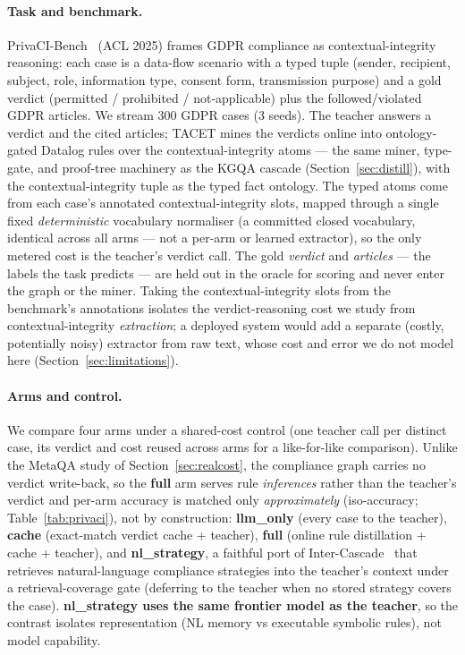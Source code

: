 \documentclass[11pt]{article}
\theoremstyle{plain}
\begin{document}
\paragraph{Task and benchmark.} PrivaCI-Bench~\citep{privacibench2025} (ACL
2025) frames GDPR compliance as contextual-integrity reasoning: each case is a
data-flow scenario with a typed tuple (sender, recipient, subject, role,
information type, consent form, transmission purpose) and a gold verdict
(permitted / prohibited / not-applicable) plus the followed/violated GDPR
articles. We stream $300$ GDPR cases ($3$ seeds). The teacher answers a
verdict and the cited articles; TACET mines the verdicts online into
ontology-gated Datalog rules over the contextual-integrity atoms --- the same
miner, type-gate, and proof-tree machinery as the KGQA cascade
(Section~\ref{sec:distill}), with the contextual-integrity tuple as the typed
fact ontology. The typed atoms come from each case's annotated
contextual-integrity slots, mapped through a single fixed \emph{deterministic}
vocabulary normaliser (a committed closed vocabulary, identical across all arms
--- not a per-arm or learned extractor), so the only metered cost is the
teacher's verdict call. The gold \emph{verdict} and \emph{articles} --- the
labels the task predicts --- are held out in the oracle for scoring and never
enter the graph or the miner. Taking the contextual-integrity slots from the
benchmark's annotations isolates the verdict-reasoning cost we study from
contextual-integrity \emph{extraction}; a deployed system would add a separate
(costly, potentially noisy) extractor from raw text, whose cost and error we do
not model here (Section~\ref{sec:limitations}).

\paragraph{Arms and control.} We compare four arms under a shared-cost
control (one teacher call per distinct case, its verdict and cost reused across
arms for a like-for-like comparison). Unlike the MetaQA study of
Section~\ref{sec:realcost}, the compliance graph carries no verdict write-back,
so the \textbf{full} arm serves rule \emph{inferences} rather than the teacher's
verdict and per-arm accuracy is matched only \emph{approximately}
(iso-accuracy; Table~\ref{tab:privaci}), not by construction: \textbf{llm\_only}
(every case to the teacher),
\textbf{cache} (exact-match verdict cache + teacher), \textbf{full} (online
rule distillation + cache + teacher), and \textbf{nl\_strategy}, a faithful
port of Inter-Cascade~\citep{intercascade2025} that retrieves
natural-language compliance strategies into the teacher's context under a
retrieval-coverage gate (deferring to the teacher when no stored strategy
covers the case). \textbf{nl\_strategy uses the same frontier model as the
teacher}, so the contrast isolates representation (NL memory vs executable
symbolic rules), not model capability.
\end{document}
